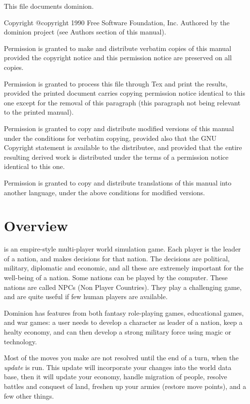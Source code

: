 \begin{ifinfo}
This file documents dominion.

Copyright @copyright{} 1990 Free Software Foundation, Inc.
Authored by the dominion project (see Authors section of this manual).

Permission is granted to make and distribute verbatim copies of this manual
provided the copyright notice and this permission notice are preserved on
all copies.
\begin{ignore}
Permission is granted to process this file through Tex and print the
results, provided the printed document carries copying permission notice
identical to this one except for the removal of this paragraph (this
paragraph not being relevant to the printed manual).
\end{ignore}
Permission is granted to copy and distribute modified versions of this
manual under the conditions for verbatim copying, provided also that the
GNU Copyright statement is available to the distributee, and provided that
the entire resulting derived work is distributed under the terms of a
permission notice identical to this one.

Permission is granted to copy and distribute translations of this manual
into another language, under the above conditions for modified versions.
\end{ifinfo}

\clearpage
{}

\chapter{Overview}

 is an empire-style multi-player world simulation game.
Each player is the leader of a nation, and makes decisions for that
nation.  The decisions are political, military, diplomatic and
economic, and all these are extremely important for the well-being of
a nation.  Some nations can be played by the computer.  These nations
are called NPCs (Non Player Countries).  They play a challenging game,
and are quite useful if few human players are available.

Dominion has features from both fantasy role-playing games, educational
games, and war games: a user needs to develop a character as leader of
a nation, keep a healty economy, and can then develop a strong
military force using magic or technology.

Most of the moves you make are not resolved until the end of a turn,
when the \emph{update} is run.  This update will incorporate your
changes into the world data base, then it will update your economy,
handle migration of people, resolve battles and conquest of land,
freshen up your armies (restore move points), and a few other things.


